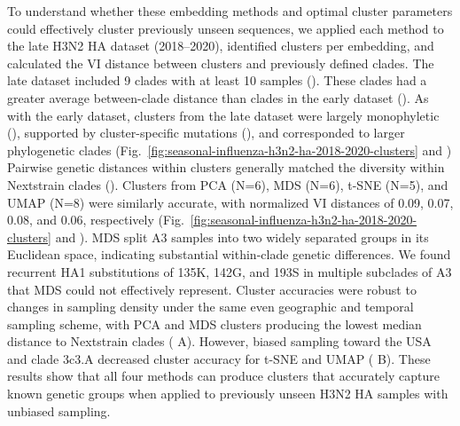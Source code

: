 \documentclass[10pt,letterpaper]{article}
\begin{document}
To understand whether these embedding methods and optimal cluster parameters could effectively cluster previously unseen sequences, we applied each method to the late H3N2 HA dataset (2018--2020), identified clusters per embedding, and calculated the VI distance between clusters and previously defined clades.
The late dataset included 9 clades with at least 10 samples ().
These clades had a greater average between-clade distance than clades in the early dataset ().
As with the early dataset, clusters from the late dataset were largely monophyletic (), supported by cluster-specific mutations (), and corresponded to larger phylogenetic clades (Fig.~\ref{fig:seasonal-influenza-h3n2-ha-2018-2020-clusters} and )
Pairwise genetic distances within clusters generally matched the diversity within Nextstrain clades ().
Clusters from PCA (N=6), MDS (N=6), t-SNE (N=5), and UMAP (N=8) were similarly accurate, with normalized VI distances of 0.09, 0.07, 0.08, and 0.06, respectively (Fig.~\ref{fig:seasonal-influenza-h3n2-ha-2018-2020-clusters} and ).
MDS split A3 samples into two widely separated groups in its Euclidean space, indicating substantial within-clade genetic differences.
We found recurrent HA1 substitutions of 135K, 142G, and 193S in multiple subclades of A3 that MDS could not effectively represent.
Cluster accuracies were robust to changes in sampling density under the same even geographic and temporal sampling scheme, with PCA and MDS clusters producing the lowest median distance to Nextstrain clades ( A).
However, biased sampling toward the USA and clade 3c3.A decreased cluster accuracy for t-SNE and UMAP ( B).
These results show that all four methods can produce clusters that accurately capture known genetic groups when applied to previously unseen H3N2 HA samples with unbiased sampling.
\end{document}
